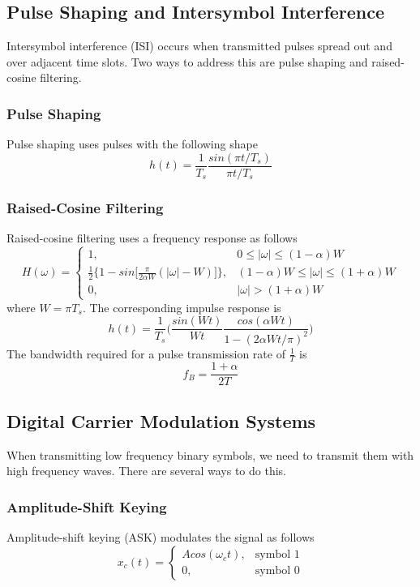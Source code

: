 \documentclass[]{article}
\begin{document}
\subsection{Pulse Shaping and Intersymbol Interference}
Intersymbol interference (ISI) occurs when transmitted pulses spread out and over adjacent time slots. Two ways to address this are pulse shaping and raised-cosine filtering.
\subsubsection{Pulse Shaping}
Pulse shaping uses pulses with the following shape
\begin{equation} h(t) = \frac{1}{T_{s}}\frac{sin(\pi t/T_{s})}{\pi t/T_{s}} \end{equation}
\subsubsection{Raised-Cosine Filtering}
Raised-cosine filtering uses a frequency response as follows
\begin{equation} H(\omega)=\begin{cases}
1, & 0 \leq |\omega| \leq (1-\alpha)W \\
\frac{1}{2}\bigg\{ 1- sin\big[ \frac{\pi}{2\alpha W}(|\omega|-W) \big] \bigg\}, & (1-\alpha)W \leq |\omega| \leq (1+\alpha)W \\
0, & |\omega| > (1+\alpha)W
\end{cases} \end{equation}
where $W=\pi T_{s}$. The corresponding impulse response is
\begin{equation} h(t) = \frac{1}{T_{s}} \bigg( \frac{sin(Wt)}{Wt}\frac{cos(\alpha Wt)}{1-(2 \alpha Wt/\pi)^{2}} \bigg) \end{equation}
The bandwidth required for a pulse transmission rate of $\frac{1}{T}$ is 
\begin{equation} f_{B} = \frac{1+\alpha}{2T} \end{equation}
\subsection{Digital Carrier Modulation Systems}
When transmitting low frequency binary symbols, we need to transmit them with high frequency waves. There are several ways to do this.
\subsubsection{Amplitude-Shift Keying}
Amplitude-shift keying (ASK) modulates the signal as follows
\begin{equation} x_{c}(t)=\begin{cases}Acos(\omega_{c}t), & \text{symbol 1} \\
0, & \text{symbol 0}
\end{cases} \end{equation}
\end{document}
